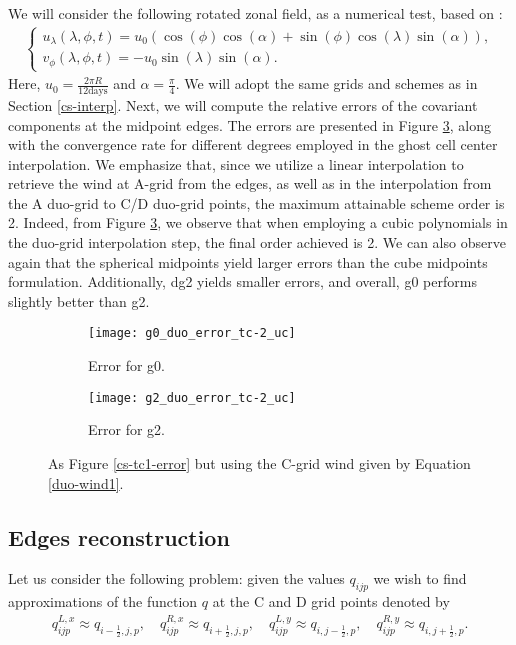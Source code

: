 We will consider the following rotated zonal field, as a numerical test, based on \citet{will:1992}:
\begin{align}
	\label{duo-wind1}
	\begin{cases}
		u_\lambda(\lambda,\phi,t) = u_0(\cos(\phi)\cos(\alpha) + \sin(\phi)\cos(\lambda)\sin(\alpha)),\\
		v_\phi(\lambda,\phi,t) = -u_0\sin(\lambda)\sin(\alpha).
	\end{cases}
\end{align}
Here,  $u_0 = \frac{2\pi R}{12 \text{days}}$ and $\alpha= \frac{\pi}{4}$. We will adopt the same grids and schemes as in Section \ref{cs-interp}.
Next, we will compute the relative errors of the covariant components at the midpoint edges.
The errors are presented in Figure \ref{cs-tc2-error}, along with the convergence rate for different degrees employed in the ghost cell center interpolation.
We emphasize that, since we utilize a linear interpolation to retrieve the wind at A-grid from the edges, as well as in the interpolation
from the A duo-grid to C/D duo-grid points, the maximum attainable scheme order is 2.
Indeed, from Figure \ref{cs-tc2-error}, we observe that when employing a cubic polynomials in the duo-grid interpolation step, the final order achieved is 2.
We can also observe again that the spherical midpoints yield larger errors than the cube midpoints formulation.
Additionally, dg2 yields smaller errors, and overall, g0 performs slightly better than g2.
\begin{figure}[!htb]
	\centering
	\begin{subfigure}{0.45\textwidth}
		\centering
		\texttt{[image: g0\_duo\_error\_tc-2\_uc]}
		\caption{Error for g0.\label{cs-duoscalar-tc2-g0}}
	\end{subfigure}
	\begin{subfigure}{0.45\textwidth}
		\centering
		\texttt{[image: g2\_duo\_error\_tc-2\_uc]}
		\caption{Error for g2.\label{cs-duoscalar-tc2-g2}}
	\end{subfigure}
	\caption{As Figure \ref{cs-tc1-error} but using the C-grid wind given by Equation \eqref{duo-wind1}.\label{cs-tc2-error}}
\end{figure}

\newpage
\subsection{Edges reconstruction}
\label{cs-recon}
Let us consider the following problem: given the values $q_{ijp}$ we wish to find 
approximations of the function $q$ at the C and D grid points denoted by
\begin{align*}
	q^{L,x}_{ijp}  \approx q_{{i-\frac{1}{2}},j,p},\quad
	q^{R,x}_{ijp}  \approx q_{{i+\frac{1}{2}},j,p},\quad
	q^{L,y}_{ijp}  \approx q_{i,{j-\frac{1}{2}},p},\quad
	q^{R,y}_{ijp}  \approx q_{i,{j+\frac{1}{2}},p}.
\end{align*}

